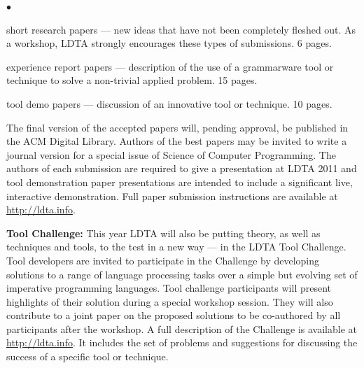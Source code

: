 \documentclass[10pt,A4paper]{article} \usepackage{graphicx,url}
\newenvironment{inditemlist}{
                         \begin{list}{{$\bullet$}} 
                         {\setlength{\itemsep}{0pt} 
                         \setlength{\topsep}{0pt} 
                         \setlength{\partopsep}{2pt}
                         \setlength{\leftmargin}{12pt} 
                         \setlength{\labelwidth}{8pt} 
                         \setlength{\labelsep}{2pt} 
                         \setlength{\listparindent}{0pt}
                         \setlength{\parsep}{0.07cm}
                         \usecounter{enumi} 
                         \setlength{\parskip}{0.2cm}}}{\end{list}\vspace{2mm} }
\begin{document}
\begin{minipage}[t]{5.1in}
\begin{inditemlist}
\item short research papers --- new ideas that have not been
  completely fleshed out.  As a workshop, LDTA strongly encourages
  these types of submissions. 6 pages.

\item experience report papers --- description of the use of a grammarware
  tool or technique to solve a non-trivial applied problem. 15 pages.

\item tool demo papers --- discussion of an innovative tool or technique.
  10 pages.
\end{inditemlist}
The final version of the accepted papers will,
pending approval, be published in the ACM Digital Library.  Authors of
the best papers may be invited to write a journal version for a
special issue of Science of Computer Programming.
%
The authors of each submission are required to give a presentation at
LDTA 2011 and tool demonstration paper presentations are intended to
include a significant live, interactive demonstration.
%
Full paper submission instructions are available at \url{http://ldta.info}.

\medskip
\textbf{Tool Challenge:}
This year LDTA will also be putting theory, as well as techniques and
tools, to the test in a new way --- in the LDTA Tool Challenge.  Tool
developers are invited to participate in the Challenge by developing
solutions to a range of language processing tasks over a simple but
evolving set of imperative programming languages.  Tool challenge
participants will present highlights of their solution during a
special workshop session.  They will also contribute to a joint paper on the
 proposed solutions to be co-authored by all
participants after the workshop.  
%
A full description of the Challenge is available at
\url{http://ldta.info}.  It includes the set of
problems and suggestions for discussing the success of a specific
tool or technique.






\end{minipage}
\end{document}
